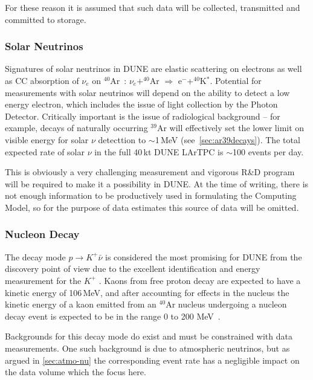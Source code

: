 For these reason it is assumed that such data will be collected, transmitted and committed to storage.


\subsubsection{Solar Neutrinos}
\label{sec:solar-data}
Signatures of solar neutrinos in DUNE are elastic scattering on electrons as well as CC absorption of $\nu_e$ on
$^{40}$Ar~\cite{cdr_vol2}: $\nu_e+^{40}$Ar $\Rightarrow$ e$^-$+$^{40}$K$^*$. Potential for measurements
with solar neutrinos will depend on the ability to detect a low energy electron, which includes the issue of light collection by
the Photon Detector. Critically important is the issue of radiological background -- for example, decays of naturally occurring
$^{39}$Ar will effectively set the lower limit on visible energy for solar $\nu$ detecttion to $\sim$1\,MeV (see~\ref{sec:ar39decays}).
The total expected rate of solar $\nu$ in the full 40\,kt DUNE LArTPC is $\sim$100 events per day.

This is obviously a very challenging measurement and vigorous R\&D program will be required to make it a possibility in DUNE.
At the time of writing, there is not enough information to be productively used in formulating the Computing Model, so for the
purpose of data estimates this source of data will be omitted.


\subsubsection{Nucleon Decay}
\label{sec:pdk-data}
The decay mode $p \rightarrow K^+\bar{\nu}$ is considered the most promising
for DUNE  from the discovery point of view due to the excellent  
identification and energy measurement for the $K^+$ \cite{cdr_vol2}.
Kaons from free proton decay are expected to have a kinetic
energy of 106\,MeV, and after accounting for effects in the nucleus the kinetic energy of a kaon
emitted from an $^{40}$Ar nucleus undergoing a nucleon decay event is expected to be in the range
0 to 200 MeV~\cite{muon_bkgd_pdk}.

Backgrounds for this decay mode do exist and must be constrained with data measurements.
One such background is due to atmospheric neutrinos,
but as argued in \ref{sec:atmo-nu} the corresponding event rate has a negligible impact on the
data volume which the focus here.

